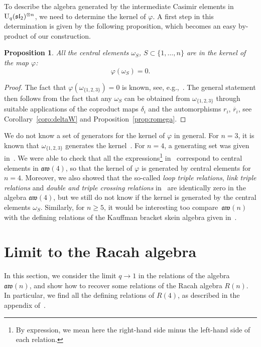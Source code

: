 \documentclass[10pt,a4paper]{amsart}
\numberwithin{equation}{section}
\newcommand{\vph}{\varphi}
\newtheorem{prop}[theo]{Proposition}
\theoremstyle{definition}
\newcommand{\rb}{\overline{r}}
\newcommand{\aw}{\mathfrak{aw}(n)}
\begin{document}
To describe the algebra generated by the intermediate Casimir elements in ${\rm U}_q(\mathfrak{sl}_2)^{\otimes n}$, we need to determine the kernel of $\vph$. A first step in this determination is given by the following proposition, which becomes an easy by-product of our construction.
\begin{prop}
All the central elements $\omega_S$, $S\subset\{1,\dots,n\}$ are in the kernel of the map $\vph$:%
\begin{equation*}
\vph(\omega_S)=0.
\end{equation*}
\end{prop}
\begin{proof}
The fact that $\vph(\omega_{\{1,2,3\}})=0$ is known, see, e.g.,~\cite{avatar}. The general statement then follows from the fact that any $\omega_S$ can be obtained from $\omega_{\{1,2,3\}}$ through suitable applications of the coproduct maps $\delta_i$ and the automorphisms $r_i$, $\rb_i$, see Corollary~\ref{coro:deltaW} and Proposition~\ref{prop:romega}.
\end{proof}

We do not know a set of generators for the kernel of $\vph$ in general. For $n=3$, it is known that $\omega_{\{1,2,3\}}$ generates the kernel~\cite{avatar}.
For $n=4$, a generating set was given in~\cite[Appendix~A]{CL}. We were able to check
 that all the expressions\footnote{By expression, we mean here the right-hand side
minus the left-hand side of each relation.} in~\cite[Appendix~A]{CL} correspond to central elements in $\mathfrak{aw}(4)$, so that the kernel of $\vph$ is generated by central elements for $n=4$. Moreover, we also showed that the so-called \textit{loop triple relations}, \textit{link triple relations} and \textit{double and triple crossing relations} in~\cite{CL} are identically zero in the algebra
$\mathfrak{aw}(4)$, but we still do not know if the kernel is generated by the central elements $\omega_S$. Similarly, for $n\geq5$, it would be interesting too compare~$\aw$ with the defining relations of the Kauffman bracket skein algebra given in~\cite{Skein5}.

\section{Limit to the Racah algebra}\label{sec-limit}

In this section, we consider the limit $q\to1$ in the relations of the algebra $\mathfrak{aw}(n)$, and show how to recover some relations of the Racah algebra $R(n)$. In particular, we find all the defining relations of $R(4)$, as described in the appendix of~\cite{CFR}.
\end{document}
